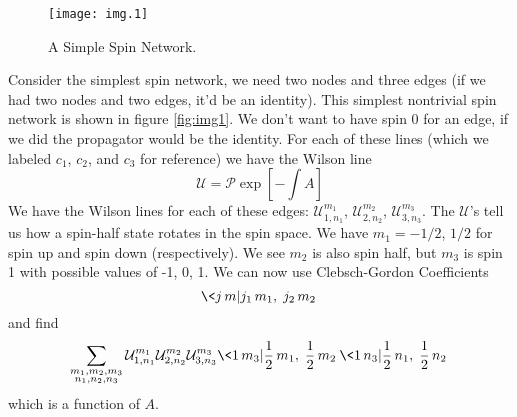 
\begin{figure}
\texttt{[image: img.1]}
\caption{A Simple Spin Network.}\label{fig:img1}
\end{figure}

Consider the simplest spin network, we need two nodes and three
edges (if we had two nodes and two edges, it'd be an
identity). This simplest nontrivial spin network is shown in
figure \eqref{fig:img1}. We don't want to have spin 0 for an
edge, if we did the propagator would be the identity. For each of
these lines (which we labeled $c_1$, $c_2$, and $c_3$ for
reference) we have the Wilson line 
\begin{equation}
\mathcal{U}=\mathcal{P}\exp\left[-\int A\right]
\end{equation}
We have the Wilson lines for each of these edges:
$\mathcal{U}^{m_{1}}_{1,n_{1}}$,
$\mathcal{U}^{m_{2}}_{2,n_{2}}$,
$\mathcal{U}^{m_{3}}_{3,n_{3}}$. The $\mathcal{U}$'s tell us
how a spin-half state rotates in the spin space. We have
$m_{1}=-1/2$, $1/2$ for spin up and spin down (respectively). We
see $m_{2}$ is also spin half, but $m_{3}$ is spin 1 with
possible values of -1, 0, 1. We can now use Clebsch-Gordon
Coefficients
\begin{equation}
\< j\,m|j_{1}\,m_{1},\; j_{2}\,m_{2}\>
\end{equation}
and find
\begin{equation}
\sum_{\substack{ m_1, m_2, m_3\\
n_1, n_2, n_3}} \mathcal{U}^{m_{1}}_{1,n_{1}}\mathcal{U}^{m_{2}}_{2,n_{2}}\mathcal{U}^{m_{3}}_{3,n_{3}}\<1\,m_{3}|\frac{1}{2}\,m_{1},\;\frac{1}{2}\,m_{2}\>\<1\,n_{3}|\frac{1}{2}\,n_{1},\;\frac{1}{2}\,n_{2}\>
\end{equation}
which is a function of $A$.

